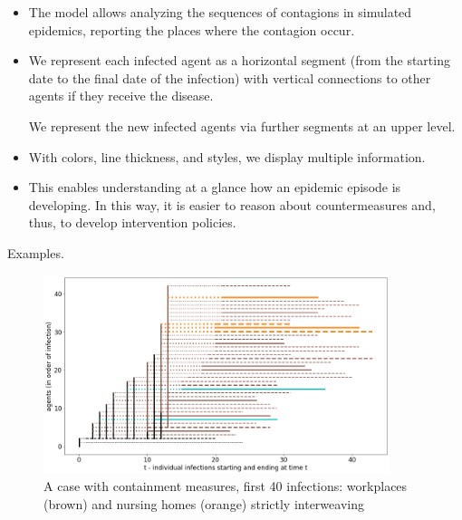 \documentclass[graybox]{svmult}
\begin{document}
  \begin{itemize}
  \item
The model allows analyzing the sequences of contagions in simulated epidemics, reporting the places where the contagion occur. 
  \item
We represent each infected agent as a horizontal segment (from the starting date to the final date of the infection) with vertical connections to other agents if they receive the disease.

We represent the new infected agents via further segments at an upper level. 

  \item
With colors, line thickness, and styles, we display multiple information. 

  \item
This enables understanding at a glance how an epidemic episode is developing. In this way, it is easier to reason about countermeasures and, thus, to develop intervention policies.

  \end{itemize}

Examples.

\begin{figure}[t]
\center
\includegraphics[width=0.9\textwidth]{with8b40.png}%
\caption{A case with containment measures, first 40 infections: workplaces (brown) and nursing homes (orange) strictly interweaving}
\label{workplacesNursingHomes}
\end{figure}
\end{document}
